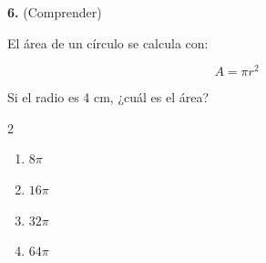 \textbf{6.} (Comprender)

El área de un círculo se calcula con:

\[
A = \pi r^2
\]

Si el radio es 4 cm, ¿cuál es el área?

\begin{multicols}{2}
\begin{enumerate}[label=\alph*), leftmargin=*]
\item $8\pi$
\item $16\pi$
\item $32\pi$
\item $64\pi$
\end{enumerate}
\end{multicols}